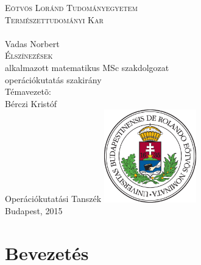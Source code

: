 \documentclass[12pt, a4paper]{report}
\theoremstyle{remark}
\theoremstyle{definition}
\begin{document}

\begin{titlepage}
\begin{center}
{\huge \textsc{Eötvös Loránd Tudományegyetem \\ Természettudományi Kar \\}}
\hrulefill \\[2.5cm]
{\huge Vadas Norbert} \\[0.7cm]
{\Huge \textsc{Élszínezések}} \\[0.7cm]
alkalmazott matematikus MSc szakdolgozat \\[0.1cm]
operációkutatás szakirány \\[2.2cm]
{\large Témavezetõ:} \\[0.4cm]
{\Large Bérczi Kristóf} \\[0.3cm] 
{\Large Operációkutatási Tanszék}
\vfill
\includegraphics[width=0.3\textwidth]{./images/elte_cimer_szines} \\[0.5cm]
{\large Budapest, 2015}
\end{center}
\end{titlepage}

\tableofcontents

\chapter{Bevezetés} 
\end{document}
